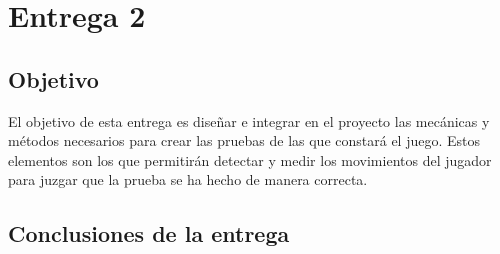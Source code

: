 \section{Entrega 2}


\subsection{Objetivo}

El objetivo de esta entrega es diseñar e integrar en el proyecto las mecánicas y métodos necesarios para crear las pruebas de las que constará el juego. Estos elementos son los que permitirán detectar y medir los movimientos del jugador para juzgar que la prueba se ha hecho de manera correcta.











\subsection{Conclusiones de la entrega}


